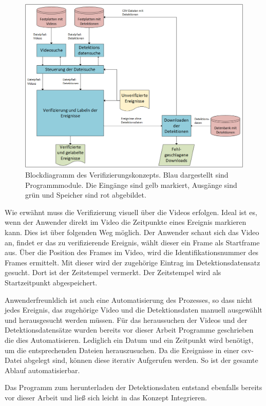 \begin{figure}[htbp]
    \centering
    \includegraphics[width=\textwidth]{img/Grafiken/Verifizierungstool Konzept.png}
    \caption[Blockdiagramm des Verifizierungskonzepts.]{Blockdiagramm des Verifizierungskonzepts. Blau dargestellt sind Programmmodule. Die Eingänge sind gelb markiert, Ausgänge sind grün und Speicher sind rot abgebildet.}
    \label{fig:BlockLabeling}
\end{figure}


Wie erwähnt muss die Verifizierung visuell über die Videos erfolgen. Ideal ist es, wenn der Anwender direkt im Video die Zeitpunkte eines Ereignis markieren kann. Dies ist über folgenden Weg möglich. Der Anwender schaut sich das Video an, findet er das zu verifizierende Ereignis, wählt dieser ein Frame als Startframe aus. Über die Position des Frames im Video, wird die Identifikationsnummer des Frames ermittelt. Mit dieser wird der zugehörige Eintrag im Detektionsdatensatz gesucht. Dort ist der Zeitstempel vermerkt. Der Zeitstempel wird als Startzeitpunkt abgespeichert. \par 

Anwenderfreunldich ist auch eine Automatisierung des Prozesses, so dass nicht jedes Ereignis, das zugehörige Video und die Detektionsdaten manuell ausgewählt und herausgesucht werden müssen. Für das heraussuchen der Videos und der Detektionsdatensätze wurden bereits vor dieser Arbeit Programme geschrieben die dies Automatisieren. Lediglich ein Datum und ein Zeitpunkt wird benötigt, um die entsprechenden Dateien herauszusuchen. Da die Ereignisse in einer csv-Datei abgelegt sind, können diese iterativ Aufgerufen werden. So ist der gesamte Ablauf automatisierbar. \par

Das Programm zum herunterladen der Detektionsdaten entstand ebenfalls bereits vor dieser Arbeit und ließ sich leicht in das Konzept Integrieren. 